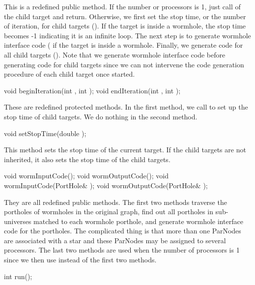 This is a redefined public method.  If the number or processors is 1,
just call  of the child target and return. 
Otherwise, we first
set the stop time, or the number of iteration, for child targets
(). If the target is inside a wormhole,
the stop time becomes -1 indicating it is an infinite loop.
The next step is to generate wormhole interface code
( if the target is inside a wormhole.
Finally, we generate code for all child targets 
().
Note that we generate wormhole interface code before generating code
for child targets since  we can not intervene the code generation procedure of
each child target once started.

\begin{example}
void beginIteration(int , int );
void endIteration(int , int );
\end{example}

These are redefined protected methods. In the first method, we call
 to set up the stop time of child targets.
We do nothing in the second method.

\begin{example}
void setStopTime(double );
\end{example}

This method sets the stop time of the current target. If the child
targets are not inherited, it also sets the stop time of the
child targets.

\begin{example}
void wormInputCode();
void wormOutputCode();
void wormInputCode(PortHole& );
void wormOutputCode(PortHole& );
\end{example}

They are all redefined public methods. The first two methods traverse
the portholes of wormholes in the original graph, find out all
portholes in sub-universes matched to each wormhole porthole, and generate
wormhole interface code for the portholes.
The complicated thing is that
more than one ParNodes are associated with a star and these ParNodes
may be assigned to several processors.
The last two methods are used when the number of processors is 1 since we
then use  instead of the first
two methods.
 
\begin{example}
int run();
\end{example}

